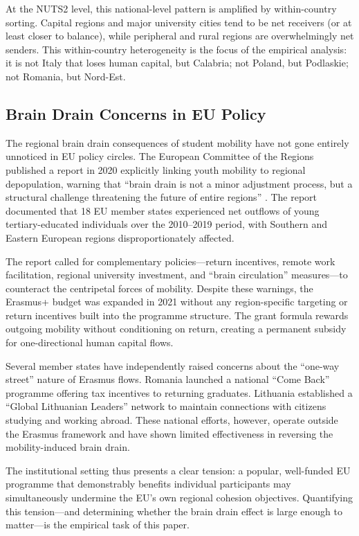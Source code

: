 \documentclass[12pt]{article}
\begin{document}
At the NUTS2 level, this national-level pattern is amplified by within-country sorting. Capital regions and major university cities tend to be net receivers (or at least closer to balance), while peripheral and rural regions are overwhelmingly net senders. This within-country heterogeneity is the focus of the empirical analysis: it is not Italy that loses human capital, but Calabria; not Poland, but Podlaskie; not Romania, but Nord-Est.

\subsection{Brain Drain Concerns in EU Policy}

The regional brain drain consequences of student mobility have not gone entirely unnoticed in EU policy circles. The European Committee of the Regions published a report in 2020 explicitly linking youth mobility to regional depopulation, warning that ``brain drain is not a minor adjustment process, but a structural challenge threatening the future of entire regions'' \citep{ec_cor_2020}. The report documented that 18 EU member states experienced net outflows of young tertiary-educated individuals over the 2010--2019 period, with Southern and Eastern European regions disproportionately affected.

The report called for complementary policies---return incentives, remote work facilitation, regional university investment, and ``brain circulation'' measures---to counteract the centripetal forces of mobility. Despite these warnings, the Erasmus+ budget was expanded in 2021 without any region-specific targeting or return incentives built into the programme structure. The grant formula rewards outgoing mobility without conditioning on return, creating a permanent subsidy for one-directional human capital flows.

Several member states have independently raised concerns about the ``one-way street'' nature of Erasmus flows. Romania launched a national ``Come Back'' programme offering tax incentives to returning graduates. Lithuania established a ``Global Lithuanian Leaders'' network to maintain connections with citizens studying and working abroad. These national efforts, however, operate outside the Erasmus framework and have shown limited effectiveness in reversing the mobility-induced brain drain.

The institutional setting thus presents a clear tension: a popular, well-funded EU programme that demonstrably benefits individual participants may simultaneously undermine the EU's own regional cohesion objectives. Quantifying this tension---and determining whether the brain drain effect is large enough to matter---is the empirical task of this paper.
\end{document}
